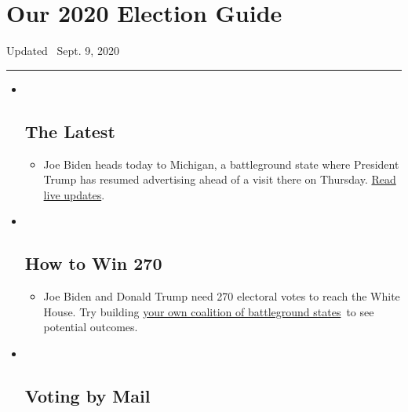 \hypertarget{our-2020-election-guide}{%
\section{Our 2020 Election Guide}\label{our-2020-election-guide}}

Updated ~Sept. 9, 2020

\begin{center}\rule{0.5\linewidth}{\linethickness}\end{center}

\begin{itemize}
\item ~
  \hypertarget{the-latest}{%
  \subsection{The Latest}\label{the-latest}}

  \begin{itemize}
  \item
    Joe Biden heads today to Michigan, a battleground state where
    President Trump has resumed advertising ahead of a visit there on
    Thursday.
    \href{https://www.nytimes3xbfgragh.onion/live/2020/09/09/us/trump-vs-biden?action=click\&pgtype=Article\&state=default\&region=BELOW_MAIN_CONTENT\&context=storylines_guide}{Read
    live updates}.
  \end{itemize}
\item ~
  \hypertarget{how-to-win-270}{%
  \subsection{How to Win 270}\label{how-to-win-270}}

  \begin{itemize}
  \item
    Joe Biden and Donald Trump need 270 electoral votes to reach the
    White House. Try building
    \href{https://www.nytimes3xbfgragh.onion/interactive/2020/us/elections/election-states-biden-trump.html?action=click\&pgtype=Article\&state=default\&region=BELOW_MAIN_CONTENT\&context=storylines_guide}{your
    own coalition of battleground states}~to see potential outcomes.
  \end{itemize}
\item ~
  \hypertarget{voting-by-mail}{%
  \subsection{Voting by Mail}\label{voting-by-mail}}


\end{itemize}
